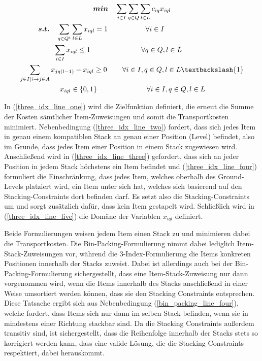 \begin{gather}
\boldsymbol{min} \quad \sum_{i \in I} \sum_{q \in Q} \sum_{l \in L} c_{iq} x_{iql} \label{three_idx_line_one} \\
\boldsymbol{s.t.} \quad \sum_{q \in Q^i} \sum_{l \in L} x_{iql} = 1 \quad\thinspace\thinspace\quad\quad\quad\quad \forall i \in I \thinspace\thinspace\quad\quad\quad\quad\quad\quad\quad\quad\thinspace\thinspace \label{three_idx_line_two} \\
\sum_{i \in I} x_{iql} \leq 1 \thinspace\quad\quad\quad\quad\quad\quad\quad \forall q \in Q, l \in L \thinspace\thinspace\thinspace\thinspace\quad\quad\quad\thinspace \label{three_idx_line_three} \\
\sum_{j \in I | i \rightarrow j \in A} x_{jq(l-1)} - x_{iql} \geq 0 \thinspace\quad\quad \forall i \in I, q \in Q, l \in L \textbackslash \{1\}
\label{three_idx_line_four} \\
\quad\quad x_{iql} \in \{0, 1\} \quad\quad\quad\quad\quad\quad\quad \forall i \in I, q \in Q, l \in L \quad\thinspace\thinspace\thinspace\thinspace\thinspace \label{three_idx_line_five}
\end{gather}

In (\ref{three_idx_line_one}) wird die Zielfunktion definiert, die erneut die Summe der Kosten sämtlicher Item-Zuweisungen
und somit die Transportkosten minimiert.
Nebenbedingung (\ref{three_idx_line_two}) fordert, dass sich jedes Item in genau einem kompatiblen Stack an genau
einer Position (Level) befindet,
also im Grunde, dass jedes Item einer Position in einem Stack zugewiesen wird.
Anschließend wird in (\ref{three_idx_line_three}) gefordert, dass sich an jeder Position in jedem Stack höchstens ein Item befindet und
(\ref{three_idx_line_four}) formuliert die Einschränkung, dass jedes Item, welches oberhalb des Ground-Levels platziert wird,
ein Item unter sich hat, welches sich basierend auf den Stacking-Constraints dort befinden darf.
Es setzt also die Stacking-Constraints um und sorgt zusätzlich dafür, dass kein Item  gestapelt wird.
Schließlich wird in (\ref{three_idx_line_five}) die Domäne der Variablen $x_{iql}$ definiert.

Beide Formulierungen weisen jedem Item einen Stack zu und minimieren dabei die Transportkosten.
Die Bin-Packing-Formulierung nimmt dabei lediglich Item-Stack-Zuweisungen vor, während die 3-Index-Formulierung die
Items konkreten Positionen innerhalb der Stacks zuweist. Dabei ist allerdings auch bei der Bin-Packing-Formulierung
sichergestellt, dass eine Item-Stack-Zuweisung nur dann vorgenommen wird, wenn die Items innerhalb des Stacks anschließend
in einer Weise umsortiert werden können, dass sie den Stacking Constraints entsprechen. Diese Tatsache ergibt sich aus Nebenbedingung (\ref{bin_packing_line_four}), welche fordert, dass Items sich nur dann im selben Stack befinden, wenn sie in mindestens einer Richtung stackbar sind.
Da die Stacking Constraints außerdem transitiv sind, ist sichergestellt, dass die Reihenfolge innerhalb der Stacks stets so korrigiert werden kann, dass eine valide Lösung, die die Stacking Constraints respektiert, dabei herauskommt.

